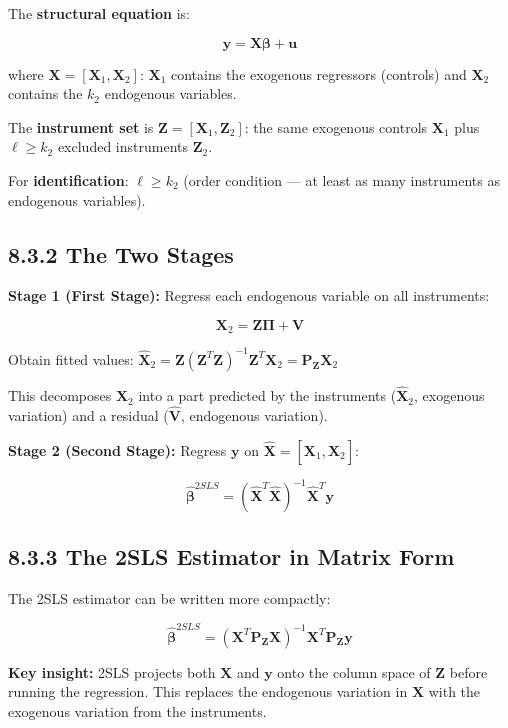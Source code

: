 The \textbf{structural equation} is:

\[
\mathbf{y} = \mathbf{X}\boldsymbol{\beta} + \mathbf{u}
\]

where $\mathbf{X} = [\mathbf{X}_1, \mathbf{X}_2]$: $\mathbf{X}_1$ contains the exogenous regressors (controls) and $\mathbf{X}_2$ contains the $k_2$ endogenous variables.

The \textbf{instrument set} is $\mathbf{Z} = [\mathbf{X}_1, \mathbf{Z}_2]$: the same exogenous controls $\mathbf{X}_1$ plus $\ell \geq k_2$ excluded instruments $\mathbf{Z}_2$.

For \textbf{identification}: $\ell \geq k_2$ (order condition --- at least as many instruments as endogenous variables).

\subsection{8.3.2 The Two Stages}

\textbf{Stage 1 (First Stage):} Regress each endogenous variable on all instruments:

\[
\mathbf{X}_2 = \mathbf{Z}\boldsymbol{\Pi} + \mathbf{V}
\]

Obtain fitted values: $\hat{\mathbf{X}}_2 = \mathbf{Z}(\mathbf{Z}^T\mathbf{Z})^{-1}\mathbf{Z}^T\mathbf{X}_2 = \mathbf{P_Z}\mathbf{X}_2$

This decomposes $\mathbf{X}_2$ into a part predicted by the instruments ($\hat{\mathbf{X}}_2$, exogenous variation) and a residual ($\hat{\mathbf{V}}$, endogenous variation).

\textbf{Stage 2 (Second Stage):} Regress $\mathbf{y}$ on $\hat{\mathbf{X}} = [\mathbf{X}_1, \hat{\mathbf{X}}_2]$:

\[
\hat{\boldsymbol{\beta}}^{2SLS} = (\hat{\mathbf{X}}^T\hat{\mathbf{X}})^{-1}\hat{\mathbf{X}}^T\mathbf{y}
\]

\subsection{8.3.3 The 2SLS Estimator in Matrix Form}

The 2SLS estimator can be written more compactly:

\[
\hat{\boldsymbol{\beta}}^{2SLS} = (\mathbf{X}^T\mathbf{P_Z}\mathbf{X})^{-1}\mathbf{X}^T\mathbf{P_Z}\mathbf{y}
\]

\textbf{Key insight:} 2SLS projects both $\mathbf{X}$ and $\mathbf{y}$ onto the column space of $\mathbf{Z}$ before running the regression. This replaces the endogenous variation in $\mathbf{X}$ with the exogenous variation from the instruments.

